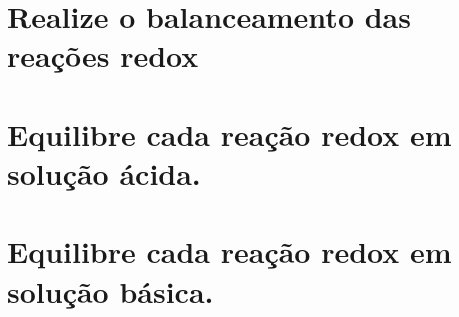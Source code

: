 \documentclass[10pt]{scrartcl}
\begin{document}
\begin{exercise}
\end{exercise}
\bigskip

\begin{exercise}
\end{exercise}




\begin{exercise}
\end{exercise}
\begin{solution}
\end{solution}
\bigskip
\bigskip





\begin{exercise}
\end{exercise}
\begin{solution}
\end{solution}
\bigskip
\bigskip


\begin{exercise}
\end{exercise}
\begin{solution}
\end{solution}
\bigskip
\bigskip






\section{Realize o balanceamento das reações redox}


\newpage

\section{Equilibre cada reação redox em solução ácida.}



\newpage


\section{Equilibre cada reação redox em solução básica.}


\end{document}
